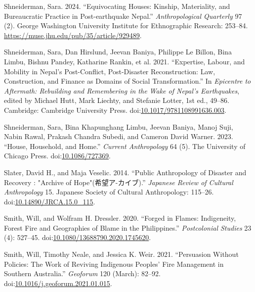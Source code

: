 \documentclass[
]{article}
\newlength{\cslhangindent}
\newenvironment{CSLReferences}[2] %
 {\begin{list}{}{%
  \setlength{\itemindent}{0pt}
  \setlength{\leftmargin}{0pt}
  \setlength{\parsep}{0pt}
  \ifodd #1
   \setlength{\leftmargin}{\cslhangindent}
   \setlength{\itemindent}{-1\cslhangindent}
  \fi
  \setlength{\itemsep}{#2\baselineskip}}}
 {\end{list}}
\begin{document}
\begin{CSLReferences}{1}{0}
Shneiderman, Sara. 2024. {``Equivocating {Houses}: {Kinship}, {Materiality}, and {Bureaucratic Practice} in {Post-earthquake Nepal}.''} \emph{Anthropological Quarterly} 97 (2). George Washington University Institute for Ethnographic Research: 253--84. \url{https://muse.jhu.edu/pub/35/article/929489}.

Shneiderman, Sara, Dan Hirslund, Jeevan Baniya, Philippe Le Billon, Bina Limbu, Bishnu Pandey, Katharine Rankin, et al. 2021. {``Expertise, {Labour}, and {Mobility} in {Nepal}'s {Post-Conflict}, {Post-Disaster Reconstruction}: {Law}, {Construction}, and {Finance} as {Domains} of {Social Transformation}.''} In \emph{Epicentre to {Aftermath}: {Rebuilding} and {Remembering} in the {Wake} of {Nepal}'s {Earthquakes}}, edited by Michael Hutt, Mark Liechty, and Stefanie Lotter, 1st ed., 49--86. Cambridge: Cambridge University Press. doi:\href{https://doi.org/10.1017/9781108991636.003}{10.1017/9781108991636.003}.

Shneiderman, Sara, Bina Khapunghang Limbu, Jeevan Baniya, Manoj Suji, Nabin Rawal, Prakash Chandra Subedi, and Cameron David Warner. 2023. {``House, {Household}, and {Home}.''} \emph{Current Anthropology} 64 (5). The University of Chicago Press. doi:\href{https://doi.org/10.1086/727369}{10.1086/727369}.

Slater, David H., and Maja Veselic. 2014. {``Public {Anthropology} of {Disaster} and {Recovery} : "{Archive} of {Hope}"(希望ア-カイブ).''} \emph{Japanese Review of Cultural Anthropology} 15. Japanese Society of Cultural Anthropology: 115--26. doi:\href{https://doi.org/10.14890/JRCA.15.0_115}{10.14890/JRCA.15.0\_115}.

Smith, Will, and Wolfram H. Dressler. 2020. {``Forged in Flames: Indigeneity, Forest Fire and Geographies of Blame in the {Philippines}.''} \emph{Postcolonial Studies} 23 (4): 527--45. doi:\href{https://doi.org/10.1080/13688790.2020.1745620}{10.1080/13688790.2020.1745620}.

Smith, Will, Timothy Neale, and Jessica K. Weir. 2021. {``Persuasion Without Policies: {The} Work of Reviving {Indigenous} Peoples' Fire Management in Southern {Australia}.''} \emph{Geoforum} 120 (March): 82--92. doi:\href{https://doi.org/10.1016/j.geoforum.2021.01.015}{10.1016/j.geoforum.2021.01.015}.


\end{CSLReferences}
\end{document}
